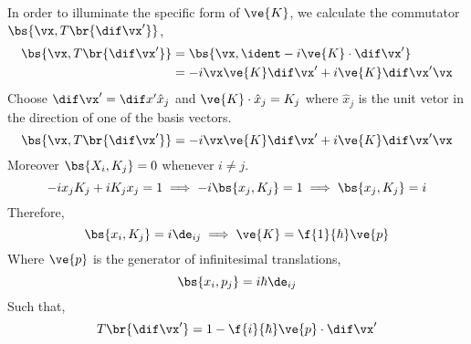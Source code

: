 \documentclass{article}
\begin{document}
In order to illuminate the specific form of $\ve{K}$, we calculate the commutator $\bs{\vx, T\br{\dif \vx'}}$,
\begin{align*}
\bs{\vx, T\br{\dif \vx'}} &= \bs{\vx, \ident - i \ve{K}\cdot\dif\vx'} \\
&= -i \vx \ve{K} \dif \vx' + i \ve{K} \dif \vx' \vx
\end{align*}
Choose $\dif \vx' = \dif x' \hat{x}_j$ and $\ve{K} \cdot \hat{x}_j = K_j$ where $\hat{x}_j$ is the unit vetor in the direction of one of the basis vectors.
\[ \bs{\vx, T\br{\dif \vx'}} = -i \vx \ve{K} \dif \vx' + i \ve{K} \dif \vx' \vx \]
Moreover $\bs{X_i, K_j} = 0$ whenever $i \neq j$.
\[ -i x_j K_j + i K_j x_j = 1 \implies -i \bs{x_j, K_j} = 1 \implies \bs{x_j, K_j} = i \]
Therefore,
\[ \bs{x_i, K_j} = i \de_{ij} \implies \ve{K} = \f{1}{\hbar} \ve{p} \]
Where $\ve{p}$ is the generator of infinitesimal translations,
\[ \bs{x_i, p_j} = i \hbar \de_{ij} \]
Such that,
\[ T\br{\dif \vx'} = 1 - \f{i}{\hbar} \ve{p} \cdot \dif \vx' \]
\end{document}
